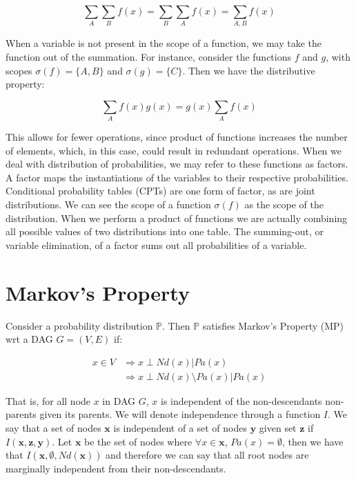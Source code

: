 \documentclass{amsart}
\theoremstyle{plain}
\newcommand{\pr}{\mathbb{P}}
\renewcommand{\implies}{\Rightarrow}
\begin{document}
\begin{equation*}
  \sum_A\sum_B f(x) = \sum_B\sum_A f(x) = \sum_{A,B} f(x)
\end{equation*}

When a variable is not present in the scope of a function, we may take the function out of the
summation. For instance, consider the functions $f$ and $g$, with scopes $\sigma(f)=\{A,B\}$ and
$\sigma(g)=\{C\}$. Then we have the distributive property:

\begin{equation*}
  \sum_{A} f(x)g(x) = g(x) \sum_{A} f(x)
\end{equation*}

This allows for fewer operations, since product of functions increases the number of elements,
which, in this case, could result in redundant operations. When we deal with distribution of
probabilities, we may refer to these functions as factors. A factor maps the instantiations of the
variables to their respective probabilities. Conditional probability tables (CPTs) are one form of
factor, as are joint distributions. We can see the scope of a function $\sigma(f)$ as the scope of
the distribution. When we perform a product of functions we are actually combining all possible
values of two distributions into one table. The summing-out, or variable elimination, of a factor
sums out all probabilities of a variable.

\section{Markov's Property}

Consider a probability distribution $\pr$. Then $\pr$ satisfies Markov's Property (MP) wrt a DAG
$G=(V,E)$ if:

\begin{align*}
  x\in V &\implies x \perp Nd(x)|Pa(x)\\
         &\implies x \perp Nd(x)\setminus Pa(x) | Pa(x)
\end{align*}

That is, for all node $x$ in DAG $G$, $x$ is independent of the non-descendants non-parents given
its parents. We will denote independence through a function $I$. We say that a set of nodes
$\mathbf{x}$ is independent of a set of nodes $\mathbf{y}$ given set $\mathbf{z}$ if $I(\mathbf{x},
\mathbf{z},\mathbf{y})$. Let $\mathbf{x}$ be the set of nodes where $\forall x \in \mathbf{x}$,
$Pa(x)=\emptyset$, then we have that $I(\mathbf{x}, \emptyset, Nd(\mathbf{x}))$ and therefore we
can say that all root nodes are marginally independent from their non-descendants.
\end{document}
